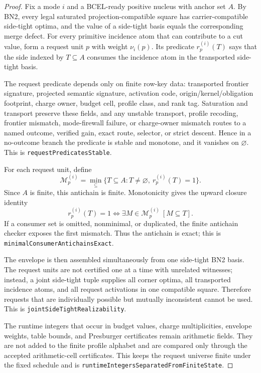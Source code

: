 \documentclass[10.5pt,a4paper]{article}
\begin{document}
\begin{proof}
Fix a mode \(i\) and a BCEL-ready positive nucleus with anchor set \(A\).  By BN2, every legal saturated projection-compatible square has carrier-compatible side-tight optima, and the value of a side-tight basis equals the corresponding merge defect.  For every primitive incidence atom that can contribute to a cut value, form a request unit \(p\) with weight \(\nu_i(p)\).  Its predicate \(r_p^{(i)}(T)\) says that the side indexed by \(T\subseteq A\) consumes the incidence atom in the transported side-tight basis.

The request predicate depends only on finite row-key data: transported frontier signature, projected semantic signature, activation code, origin/kernel/obligation footprint, charge owner, budget cell, profile class, and rank tag.  Saturation and transport preserve these fields, and any unstable transport, profile recoding, frontier mismatch, mode-firewall failure, or charge-owner mismatch routes to a named outcome, verified gain, exact route, selector, or strict descent.  Hence in a no-outcome branch the predicate is stable and monotone, and it vanishes on \(\varnothing\).  This is \texttt{requestPredicatesStable}.

For each request unit, define
\[
\mathcal M_p^{(i)}=\min_\subseteq\{T\subseteq A:T\ne\varnothing,\ r_p^{(i)}(T)=1\}.
\]
Since \(A\) is finite, this antichain is finite.  Monotonicity gives the upward closure identity
\[
r_p^{(i)}(T)=1\Longleftrightarrow \exists M\in\mathcal M_p^{(i)}\ [M\subseteq T].
\]
If a consumer set is omitted, nonminimal, or duplicated, the finite antichain checker exposes the first mismatch.  Thus the antichain is exact; this is \texttt{minimalConsumerAntichainsExact}.

The envelope is then assembled simultaneously from one side-tight BN2 basis.  The request units are not certified one at a time with unrelated witnesses; instead, a joint side-tight tuple supplies all corner optima, all transported incidence atoms, and all request activations in one compatible square.  Therefore requests that are individually possible but mutually inconsistent cannot be used.  This is \texttt{jointSideTightRealizability}.

The runtime integers that occur in budget values, charge multiplicities, envelope weights, table bounds, and Presburger certificates remain arithmetic fields.  They are not added to the finite profile alphabet and are compared only through the accepted arithmetic-cell certificates.  This keeps the request universe finite under the fixed schedule and is \texttt{runtimeIntegersSeparatedFromFiniteState}.


\end{proof}
\end{document}

